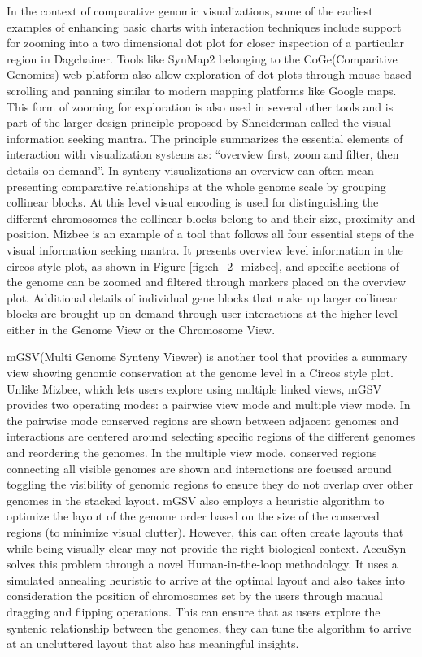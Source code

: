 In the context of comparative genomic visualizations, some of the earliest examples of enhancing basic charts with interaction techniques include support for zooming into a two dimensional dot plot for closer inspection of a particular region in Dagchainer\cite{haas2004dagchainer}. Tools like SynMap2\cite{haug2017synmap2} belonging to the CoGe(Comparitive Genomics)\cite{coge} web platform also allow exploration of dot plots through mouse-based scrolling and panning similar to modern mapping platforms like Google maps. This form of zooming for exploration is also used in several other tools and is part of the larger design principle proposed by Shneiderman\cite{Shneiderman96theeyes} called the visual information seeking mantra. The principle summarizes the essential elements of interaction with visualization systems as: ``overview first, zoom and filter, then details-on-demand''. In synteny visualizations an overview can often mean presenting comparative relationships at the whole genome scale by grouping collinear blocks. At this level visual encoding is used for distinguishing the different chromosomes the collinear blocks belong to and their size, proximity and position. Mizbee is an example of a tool that follows all four essential steps of the visual information seeking mantra\cite{Meyer2009}. It presents overview level information in the circos style plot, as shown in Figure \ref{fig:ch_2_mizbee}, and specific sections of the genome can be zoomed and filtered through markers placed on the overview plot. Additional details of individual gene blocks that make up larger collinear blocks are brought up on-demand through user interactions at the higher level either in the Genome View or the  Chromosome View. 

mGSV(Multi Genome Synteny Viewer) is another tool that provides a summary view showing genomic conservation at the genome level in a Circos style plot\cite{revanna2011gsv}. Unlike Mizbee, which lets users explore using multiple linked views, mGSV provides two operating modes: a pairwise view mode and multiple view mode. In the pairwise mode conserved regions are shown between adjacent genomes and interactions are centered around selecting specific regions of the different genomes and reordering the genomes. In the multiple view mode, conserved regions connecting all visible genomes are shown and interactions are focused around toggling the visibility of genomic regions to ensure they do not overlap over other genomes in the stacked layout. mGSV also employs a heuristic algorithm to optimize the layout of the genome order based on the size of the conserved regions (to minimize visual clutter). However, this 
can often create layouts that while being visually clear may not provide the right biological context. AccuSyn solves this problem through a novel Human-in-the-loop methodology\cite{accusyn}. It uses a simulated annealing heuristic to arrive at the optimal layout and also takes into consideration the position of chromosomes set by the users through manual dragging and flipping operations. This can ensure that as users explore the syntenic relationship between the genomes, they can tune the algorithm to arrive at an uncluttered layout that also has meaningful insights.

